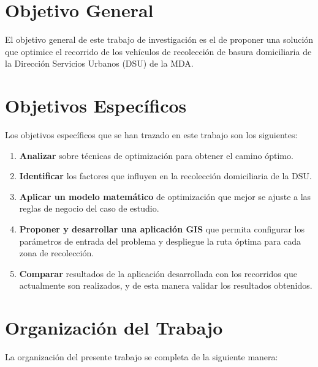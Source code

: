 \section{Objetivo General}
El objetivo general de este trabajo de investigación es el de proponer una solución que optimice el recorrido de los vehículos de recolección de basura domiciliaria de la Dirección Servicios Urbanos (DSU) de la MDA.

\section{Objetivos Específicos}

Los objetivos específicos que se han trazado en este trabajo son los siguientes:

\begin{enumerate}
    \item \textbf{Analizar} sobre técnicas de optimización para obtener el camino óptimo. 
    \item \textbf{Identificar} los factores que influyen en la recolección domiciliaria de la DSU.
    \item \textbf{Aplicar un modelo matemático} de optimización que mejor se ajuste a las reglas de negocio del caso de estudio.
    \item \textbf{Proponer y desarrollar una aplicación GIS} que permita configurar los parámetros de entrada del problema y despliegue la ruta óptima para cada zona de recolección.
    \item \textbf{Comparar} resultados de la aplicación desarrollada con los recorridos que actualmente son realizados, y de esta manera validar los resultados obtenidos.
\end{enumerate}

\section{Organización del Trabajo}

La organización del presente trabajo se completa de la siguiente manera:

